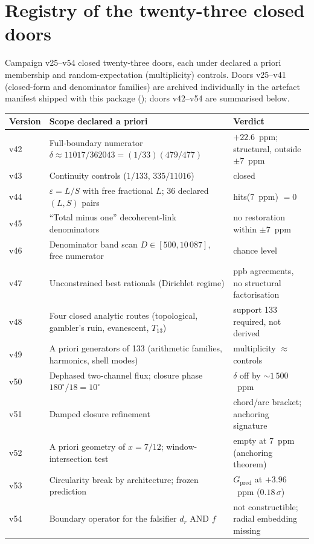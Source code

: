 \documentclass[11pt,a4paper]{article}
\begin{document}
\section{Registry of the twenty-three closed doors}
Campaign v25--v54 closed twenty-three doors, each under declared a priori membership and random-expectation (multiplicity) controls. Doors v25--v41 (closed-form and denominator families) are archived individually in the artefact manifest shipped with this package (); doors v42--v54 are summarised below.

\begin{center}
\small
\begin{tabularx}{\textwidth}{@{} >{\raggedright\arraybackslash}p{1.0cm} >{\raggedright\arraybackslash}X >{\raggedright\arraybackslash}p{4.8cm} @{}}
\toprule
Version & Scope declared a priori & Verdict \\
\midrule
v42 & Full-boundary numerator $\delta \approx 11017/362043 = (1/33)(479/477)$ & $+22.6$~ppm; structural, outside $\pm7$~ppm \\
v43 & Continuity controls ($1/133$, $335/11016$) & closed \\
v44 & $\varepsilon = L/S$ with free fractional $L$; 36 declared $(L,S)$ pairs & hits(7~ppm) $=0$ \\
v45 & ``Total minus one'' decoherent-link denominators & no restoration within $\pm7$~ppm \\
v46 & Denominator band scan $D \in [500, 10\,087]$, free numerator & chance level \\
v47 & Unconstrained best rationals (Dirichlet regime) & ppb agreements, no structural factorisation \\
v48 & Four closed analytic routes (topological, gambler's ruin, evanescent, $T_{13}$) & support 133 required, not derived \\
v49 & A priori generators of 133 (arithmetic families, harmonics, shell modes) & multiplicity $\approx$ controls \\
v50 & Dephased two-channel flux; closure phase $180^\circ/18 = 10^\circ$ & $\delta$ off by $\sim 1\,500$~ppm \\
v51 & Damped closure refinement & chord/arc bracket; anchoring signature \\
v52 & A priori geometry of $x = 7/12$; window-intersection test & empty at 7~ppm (anchoring theorem) \\
v53 & Circularity break by architecture; frozen prediction & $G_{\mathrm{pred}}$ at $+3.96$~ppm ($0.18\,\sigma$) \\
v54 & Boundary operator for the falsifier $d_r$ AND $f$ & not constructible; radial embedding missing \\
\bottomrule
\end{tabularx}
\end{center}
\end{document}
